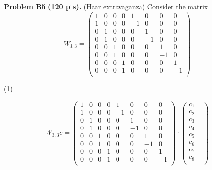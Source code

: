 \documentclass[12pt]{article}
\begin{document}
\vspace {0.25cm}\noindent
{\bf Problem B5 (120 pts).} (Haar extravaganza)
Consider the matrix
\[
W_{3, 3} =
\begin{pmatrix}
1  &  0  &  0 & 0 & 1   &  0   & 0    & 0  \\
1  &  0  &  0 & 0 & -1 &  0   & 0    & 0  \\
0   &  1  &  0 & 0 &  0  & 1   & 0    & 0  \\
0   &  1  &  0 & 0 &  0  & -1 & 0    & 0  \\
0   &  0  &  1 & 0 &  0  &  0  & 1    & 0  \\
0   &  0  &  1 & 0 &  0  &  0  & -1  & 0  \\
0   &  0  &  0 & 1 &  0  &  0  & 0    & 1  \\
0   &  0  &  0 & 1 &  0  &  0  & 0    & -1  \\
\end{pmatrix}
\]

\medskip
(1)

\[
W_{3, 3} c =
\begin{pmatrix}
1  &  0  &  0 & 0 & 1   &  0   & 0    & 0  \\
1  &  0  &  0 & 0 & -1 &  0   & 0    & 0  \\
0   &  1  &  0 & 0 &  0  & 1   & 0    & 0  \\
0   &  1  &  0 & 0 &  0  & -1 & 0    & 0  \\
0   &  0  &  1 & 0 &  0  &  0  & 1    & 0  \\
0   &  0  &  1 & 0 &  0  &  0  & -1  & 0  \\
0   &  0  &  0 & 1 &  0  &  0  & 0    & 1  \\
0   &  0  &  0 & 1 &  0  &  0  & 0    & -1  \\
\end{pmatrix}
\cdot
\begin{pmatrix}
c_1 & \\
c_2 & \\
c_3 & \\
c_4 & \\
c_5 & \\
c_6 & \\
c_7 & \\
c_8 \\
\end{pmatrix}
\]
\end{document}
